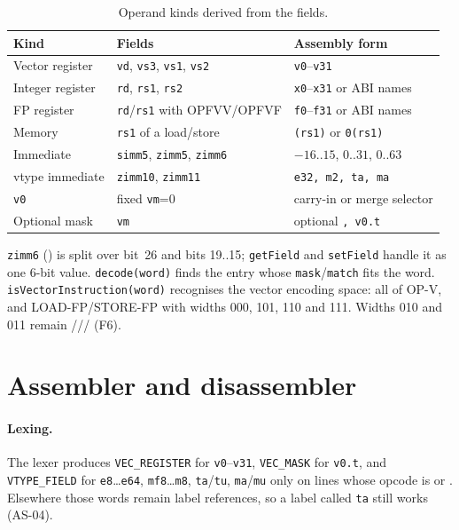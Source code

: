\documentclass[11pt]{article}
\begin{document}
\begin{table}[H]
\centering\small
\caption{Operand kinds derived from the fields.}\label{tab:operands}
\begin{tabularx}{\textwidth}{@{}L{3.2cm}L{3.6cm}Y@{}}
\toprule
Kind & Fields & Assembly form \\
\midrule
Vector register & \texttt{vd}, \texttt{vs3}, \texttt{vs1}, \texttt{vs2} & \texttt{v0}--\texttt{v31} \\
Integer register & \texttt{rd}, \texttt{rs1}, \texttt{rs2} & \texttt{x0}--\texttt{x31} or ABI names \\
FP register & \texttt{rd}/\texttt{rs1} with OPFVV/OPFVF & \texttt{f0}--\texttt{f31} or ABI names \\
Memory & \texttt{rs1} of a load/store & \texttt{(rs1)} or \texttt{0(rs1)} \\
Immediate & \texttt{simm5}, \texttt{zimm5}, \texttt{zimm6} & $-16..15$, $0..31$, $0..63$ \\
vtype immediate & \texttt{zimm10}, \texttt{zimm11} & \texttt{e32, m2, ta, ma} \\
\texttt{v0} & fixed \texttt{vm}=0 & carry-in or merge selector \\
Optional mask & \texttt{vm} & optional \texttt{, v0.t} \\
\bottomrule
\end{tabularx}
\end{table}

\texttt{zimm6} () is split over bit~26 and bits 19..15; \texttt{getField} and
\texttt{setField} handle it as one 6-bit value. \texttt{decode(word)} finds the entry whose
\texttt{mask}/\texttt{match} fits the word. \texttt{isVectorInstruction(word)} recognises the
vector encoding space: all of OP-V, and LOAD-FP/STORE-FP with widths 000, 101, 110 and 111.
Widths 010 and 011 remain /// (F6).

\section{Assembler and disassembler}\label{sec:asm}

\paragraph{Lexing.} The lexer produces \texttt{VEC\_REGISTER} for \texttt{v0}--\texttt{v31},
\texttt{VEC\_MASK} for \texttt{v0.t}, and \texttt{VTYPE\_FIELD} for \texttt{e8}\ldots\texttt{e64},
\texttt{mf8}\ldots\texttt{m8}, \texttt{ta}/\texttt{tu}, \texttt{ma}/\texttt{mu} only on lines
whose opcode is  or . Elsewhere those words remain label references,
so a label called \texttt{ta} still works (AS-04).
\end{document}

